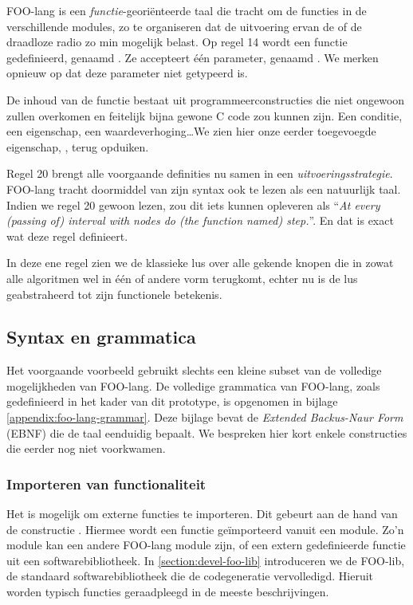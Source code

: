 FOO-lang is een \emph{functie}-geori\"enteerde taal die tracht om de functies
in de verschillende modules, zo te organiseren dat de uitvoering ervan de \mcu
of de draadloze radio zo min mogelijk belast. Op regel 14 wordt een functie
gedefinieerd, genaamd . Ze accepteert \'e\'en parameter, genaamd
. We merken opnieuw op dat deze parameter niet getypeerd is.

De inhoud van de functie bestaat uit programmeerconstructies die niet ongewoon
zullen overkomen en feitelijk bijna gewone C code zou kunnen zijn. Een
conditie, een eigenschap, een waardeverhoging\dots We zien hier onze eerder
toegevoegde eigenschap, , terug opduiken.

Regel 20 brengt alle voorgaande definities nu samen in een
\emph{uitvoeringsstrategie}. FOO-lang tracht doormiddel van zijn syntax ook te
lezen als een natuurlijk taal. Indien we regel 20 gewoon lezen, zou dit iets
kunnen opleveren als ``\emph{At every (passing of) interval with nodes do (the
function named) step.}''. En dat is exact wat deze regel definieert.

In deze ene regel zien we de klassieke lus over alle gekende knopen die in
zowat alle algoritmen wel in \'e\'en of andere vorm terugkomt, echter nu is de
lus geabstraheerd tot zijn functionele betekenis.

\subsection{Syntax en grammatica}
\label{subsection:devel-foo-lang-grammar}

Het voorgaande voorbeeld gebruikt slechts een kleine subset van de volledige
mogelijkheden van FOO-lang. De volledige grammatica van FOO-lang, zoals
gedefinieerd in het kader van dit prototype, is opgenomen in bijlage
\ref{appendix:foo-lang-grammar}. Deze bijlage bevat de \emph{Extended
Backus-Naur Form} (EBNF) die de taal eenduidig bepaalt. We bespreken hier kort
enkele constructies die eerder nog niet voorkwamen.

\subsubsection{Importeren van functionaliteit}

Het is mogelijk om externe functies te importeren. Dit gebeurt aan de hand van
de constructie . Hiermee wordt een functie
ge\"importeerd vanuit een module. Zo'n module kan een andere FOO-lang module
zijn, of een extern gedefinieerde functie uit een softwarebibliotheek. In
\ref{section:devel-foo-lib} introduceren we de FOO-lib, de standaard
softwarebibliotheek die de codegeneratie vervolledigd. Hieruit worden typisch
functies geraadpleegd in de meeste beschrijvingen.

